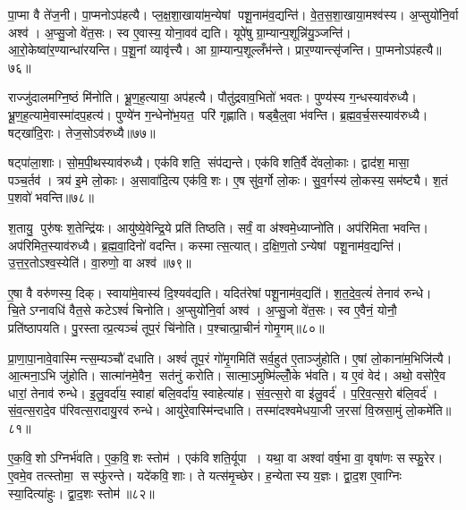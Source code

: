 पा॒प्मा वै ते॑ज॒नी। पा॒प्मनोऽप॑हत्यै। प्ल॒क्ष॒शा॒खाया॑म॒न्येषां पशू॒नाम॑व॒द्यन्ति॑। वे॒त॒स॒शा॒खाया॒मश्व॑स्य। अ॒प्सुयो॑नि॒र्वा अश्व॑। अ॒प्सु॒जो वे॑त॒सः। स्व ए॒वास्य॒ योना॒वव॑ द्यति। यूपे॑षु ग्रा॒म्यान्प॒शून्नि॑यु॒ञ्जन्ति॑। आ॒रो॒केष्वा॑र॒ण्यान्धा॑रयन्ति। प॒शू॒नां व्यावृ॑त्त्यै। आ ग्रा॒म्यान्प॒शूल्लँभ॑न्ते। प्रार॒ण्यान्त्सृ॑जन्ति। पा॒प्मनोऽप॑हत्यै॥७६॥\anuvakamend[अश्व॑स्य॒ व्यावृ॑त्त्यै॒ त्रीणि॑ च]

राज्जु॑दालमग्नि॒ष्ठं मि॑नोति। भ्रू॒ण॒ह॒त्याया॒ अप॑हत्यै। पौतु॑द्रवाव॒भितो॑ भवतः। पुण्य॑स्य ग॒न्धस्याव॑रुध्यै। भ्रू॒ण॒ह॒त्यामे॒वास्मा॑दप॒हत्य॑। पुण्ये॑न ग॒न्धेनो॑भ॒यत॒ परि॑ गृह्णाति। षड्बै॒ल्॒वा भ॑वन्ति। ब्र॒ह्म॒व॒र्च॒सस्याव॑रुध्यै। षट्खा॑दि॒राः। तेज॒सोऽव॑रुध्यै॥७७॥

षट्पा॑ला॒शाः। सो॒म॒पी॒थस्याव॑रुध्यै। एक॑विशति॒ संप॑द्यन्ते। एक॑विशति॒र्वै दे॑वलो॒काः। द्वाद॑श॒ मासा॒ पञ्च॒र्तव॑। त्रय॑ इ॒मे लो॒काः। अ॒सावा॑दि॒त्य एक॑वि॒शः। ए॒ष सु॑व॒र्गो लो॒कः। सु॒व॒र्गस्य॑ लो॒कस्य॒ सम॑ष्ट्यै। श॒तं प॒शवो॑ भवन्ति॥७८॥

श॒तायु॒ पुरु॑षः श॒तेन्द्रि॑यः। आयु॑ष्ये॒वेन्द्रि॒ये प्रति॑ तिष्ठति। सर्वं॒ वा अ॑श्वमे॒ध्याप्नो॑ति। अप॑रिमिता भवन्ति। अप॑रिमित॒स्याव॑रुध्यै। ब्र॒ह्म॒वा॒दिनो॑ वदन्ति। कस्मात्स॒त्यात्। द॒क्षि॒ण॒तोऽन्येषां पशू॒नाम॑व॒द्यन्ति॑। उ॒त्त॒र॒तोऽश्व॒स्येति॑। वा॒रुणो॒ वा अश्व॑॥७९॥

ए॒षा वै वरु॑णस्य॒ दिक्। स्वाया॑मे॒वास्य॑ दि॒श्यव॑द्यति। यदित॑रेषां पशू॒नाम॑व॒द्यति॑। श॒त॒दे॒व॒त्यं॑ तेनाव॑ रुन्धे। चि॒तेऽग्नावधि॑ वैत॒से कटेऽश्वं॑ चिनोति। अ॒प्सुयो॑नि॒र्वा अश्व॑। अ॒प्सु॒जो वे॑त॒सः। स्व ए॒वैनं॒ योनौ॒ प्रति॑ष्ठापयति। पु॒रस्तात्प्र॒त्यञ्चं॑ तूप॒रं चि॑नोति। प॒श्चात्प्रा॒चीनं॑ गोमृ॒गम्॥८०॥

प्रा॒णा॒पा॒नावे॒वास्मिन्त्स॒म्यञ्चौ॑ दधाति। अश्वं॑ तूप॒रं गो॑मृ॒गमिति॑ सर्व॒हुत॑ ए॒ताञ्जु॑होति। ए॒षां लो॒काना॑म॒भिजि॑त्यै। आ॒त्मना॒ऽभि जु॑होति। सात्मा॑नमे॒वैन॒ सत॑नुं करोति। सात्मा॒ऽमुष्मि॑ल्लोँ॒के भ॑वति। य ए॒वं वेद॑। अथो॒ वसो॑रे॒व धारां॒ तेनाव॑ रुन्धे। इ॒लु॒वर्दा॑य॒ स्वाहा॑ बलि॒वर्दा॑य॒ स्वाहेत्या॑ह। सं॒व॒त्स॒रो वा इ॑लु॒वर्द॑। प॒रि॒व॒त्स॒रो ब॑लि॒वर्द॑। सं॒व॒त्स॒रादे॒व प॑रिवत्स॒रादायु॒रव॑ रुन्धे। आयु॑रे॒वास्मि॑न्दधाति। तस्मा॑दश्वमेधया॒जी ज॒रसा॑ वि॒स्रसा॒मुं लो॒कमे॑ति॥८१॥\anuvakamend[तेज॒सोऽव॑रुध्यै भव॒न्त्यश्वो॑ गोमृ॒गमि॑लु॒वर्द॑श्च॒त्वारि॑ च]

ए॒क॒वि॒शोऽग्निर्भ॑वति। ए॒क॒वि॒शः स्तोम॑। एक॑विशति॒र्यूपा। यथा॒ वा अश्वा॑ वर्\mbox{}ष॒भा वा॒ वृषा॑णः सस्फु॒रेर\sn{}। ए॒वमे॒व तत्स्तोमा॒ सस्फु॑रन्ते। यदे॑कवि॒शाः। ते यत्स॑मृ॒च्छेर\sn{}। ह॒न्येतास्य य॒ज्ञः। द्वा॒द॒श ए॒वाग्निः स्या॒दित्या॑हुः। द्वा॒द॒शः स्तोम॑॥८२॥

